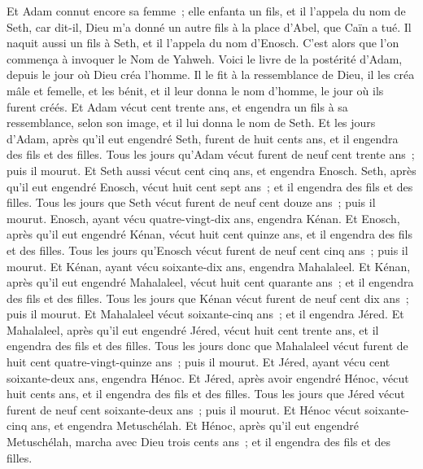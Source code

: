 \begin{multicols}{2}
Et Adam connut encore sa femme~; elle enfanta un fils, et il l'appela du nom de Seth, car dit-il, Dieu m'a donné un autre fils à la place d'Abel, que Caïn a tué.
Il naquit aussi un fils à Seth, et il l'appela du nom d'Enosch. C'est alors que l'on commença à invoquer le Nom de Yahweh.
\VerseOne{}Voici le livre de la postérité d'Adam, depuis le jour où Dieu créa l'homme. Il le fit à la ressemblance de Dieu,
il les créa mâle et femelle, et les bénit, et il leur donna le nom d'homme, le jour où ils furent créés.
Et Adam vécut cent trente ans, et engendra un fils à sa ressemblance, selon son image, et il lui donna le nom de Seth.
Et les jours d'Adam, après qu'il eut engendré Seth, furent de huit cents ans, et il engendra des fils et des filles.
Tous les jours qu'Adam vécut furent de neuf cent trente ans~; puis il mourut.
Et Seth aussi vécut cent cinq ans, et engendra Enosch.
Seth, après qu'il eut engendré Enosch, vécut huit cent sept ans~; et il engendra des fils et des filles.
Tous les jours que Seth vécut furent de neuf cent douze ans~; puis il mourut.
Enosch, ayant vécu quatre-vingt-dix ans, engendra Kénan.
Et Enosch, après qu'il eut engendré Kénan, vécut huit cent quinze ans, et il engendra des fils et des filles.
Tous les jours qu'Enosch vécut furent de neuf cent cinq ans~; puis il mourut.
Et Kénan, ayant vécu soixante-dix ans, engendra Mahalaleel.
Et Kénan, après qu'il eut engendré Mahalaleel, vécut huit cent quarante ans~; et il engendra des fils et des filles.
Tous les jours que Kénan vécut furent de neuf cent dix ans~; puis il mourut.
Et Mahalaleel vécut soixante-cinq ans~; et il engendra Jéred.
Et Mahalaleel, après qu'il eut engendré Jéred, vécut huit cent trente ans, et il engendra des fils et des filles.
Tous les jours donc que Mahalaleel vécut furent de huit cent quatre-vingt-quinze ans~; puis il mourut.
Et Jéred, ayant vécu cent soixante-deux ans, engendra Hénoc.
Et Jéred, après avoir engendré Hénoc, vécut huit cents ans, et il engendra des fils et des filles.
Tous les jours que Jéred vécut furent de neuf cent soixante-deux ans~; puis il mourut.
Et Hénoc vécut soixante-cinq ans, et engendra Metuschélah.
Et Hénoc, après qu'il eut engendré Metuschélah, marcha avec Dieu trois cents ans~; et il engendra des fils et des filles.

\end{multicols}
